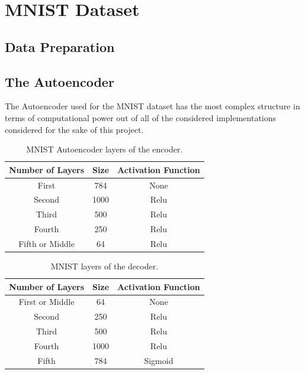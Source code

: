 \documentclass[12pt]{report}
\begin{document}
\section{MNIST Dataset}
\subsection{Data Preparation}

\subsection{The Autoencoder}
The Autoencoder used for the MNIST dataset has the most complex structure in terms of computational power out of all of the considered implementations considered for the sake of this project. 

\begin{table}[H]
	\caption{MNIST Autoencoder layers of the encoder.}
	\begin{center}
		\label{tab:table_MNIST_auto_encoder}
		\begin{tabular}{c|c|c} %
			\textbf{Number of Layers} & \textbf{Size} & \textbf{Activation Function} \\
			\hline
			First & 784 & None\\
			Second & 1000 & Relu\\
			Third & 500  & Relu\\
			Fourth & 250 & Relu\\
			Fifth or Middle & 64 & Relu\\
		\end{tabular}
	\end{center}
\end{table}

\begin{table}[H]
	\caption{MNIST layers of the decoder.}
	\begin{center}
		\label{tab:table_MNIST_auto_decoder}
		\begin{tabular}{c|c|c} %
			\textbf{Number of Layers} & \textbf{Size} & \textbf{Activation Function} \\
			\hline
			First or Middle & 64 & None\\
            Second & 250 & Relu\\
            Third & 500  & Relu\\
            Fourth & 1000 & Relu\\
            Fifth & 784 & Sigmoid \\
		\end{tabular}
	\end{center}
\end{table}
\end{document}
